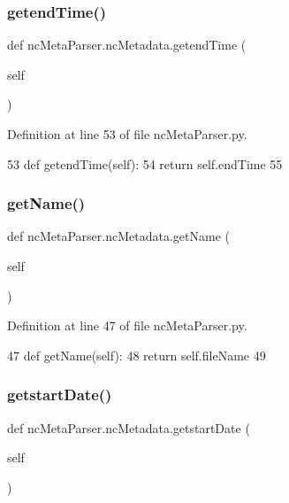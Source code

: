 \subsubsection{\texorpdfstring{getend\+Time()}{getendTime()}}
{\footnotesize\ttfamily def nc\+Meta\+Parser.\+nc\+Metadata.\+getend\+Time (\begin{DoxyParamCaption}\item[{}]{self }\end{DoxyParamCaption})}



Definition at line 53 of file nc\+Meta\+Parser.\+py.


\begin{DoxyCode}
53     \textcolor{keyword}{def }getendTime(self):
54         \textcolor{keywordflow}{return} self.endTime
55         
\end{DoxyCode}
\mbox{\label{classnc_meta_parser_1_1nc_metadata_ac262e3bca9dc97d7d55056a1931e6d1e}} 
\subsubsection{\texorpdfstring{get\+Name()}{getName()}}
{\footnotesize\ttfamily def nc\+Meta\+Parser.\+nc\+Metadata.\+get\+Name (\begin{DoxyParamCaption}\item[{}]{self }\end{DoxyParamCaption})}



Definition at line 47 of file nc\+Meta\+Parser.\+py.


\begin{DoxyCode}
47     \textcolor{keyword}{def }getName(self):
48         \textcolor{keywordflow}{return} self.fileName
49     
\end{DoxyCode}
\mbox{\label{classnc_meta_parser_1_1nc_metadata_a79b7ca324dcadb2f56066db1c663794a}} 
\subsubsection{\texorpdfstring{getstart\+Date()}{getstartDate()}}
{\footnotesize\ttfamily def nc\+Meta\+Parser.\+nc\+Metadata.\+getstart\+Date (\begin{DoxyParamCaption}\item[{}]{self }\end{DoxyParamCaption})}



